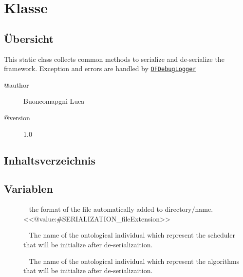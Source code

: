 
\section[OFSerializator]{Klasse }\label{ontologyFramework.OFRunning.OFSerializator-class}
\subsection{Übersicht}
This static class collects common methods to serialize and de-serialize the framework.
 Exception and errors are handled by \texttt{\hyperlink{ontologyFramework.OFErrorManagement.OFDebugLogger-class}{OFDebugLogger}}
\begin{description}
\item[@author] 
Buoncomapgni Luca
\item[@version] 
1.0
\end{description}
\subsection{Inhaltsverzeichnis}
\subsection{Variablen}
\begin{description}
\item[{\label{ontologyFramework.OFRunning.OFSerializator.SERIALIZATION_fileExtension}}]
~ the format of the file automatically added to directory$/$name\textquotedbl .<<@value:#SERIALIZATION_fileExtension>>\textquotedbl 
\item[{\label{ontologyFramework.OFRunning.OFSerializator.SCHEDULER_individualName}}]
~ The name of the ontological individual which represent the scheduler that will be initialize
 after de-serializaition.
\item[{\label{ontologyFramework.OFRunning.OFSerializator.PROCEDURE_individualName}}]
~ The name of the ontological individual which represent the algorithms that will be initialize
 after de-serializaition.
\end{description}
